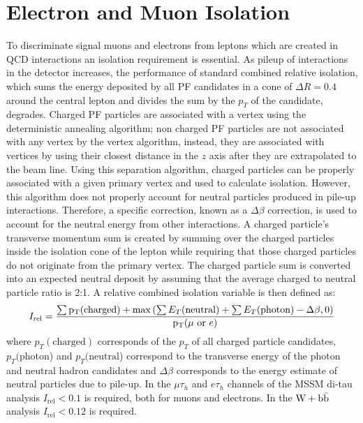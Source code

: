\section{Electron and Muon Isolation}
\label{sec:Isolation}
To discriminate signal muons and electrons from leptons
which are created in QCD interactions an isolation requirement is essential. 
As pileup of interactions in the detector increases, the performance of standard
combined relative isolation, which sums the 
energy deposited by all PF candidates in a cone of $\Delta R = 0.4$ around the central
lepton and divides the sum by the $p_{T}$ of 
the candidate, degrades. Charged PF particles are associated with 
a vertex using the deterministic annealing algorithm; non charged PF particles
are not associated with any vertex by the vertex algorithm, instead,
they are associated with vertices by using their closest distance in the
$z$ axis after they are extrapolated to the beam line. Using this separation algorithm,
charged particles can be properly associated with a given primary vertex
and used to calculate isolation. However, this algorithm does not
properly account for neutral particles produced in pile-up interactions. 
Therefore, a specific correction, known as a $\Delta \beta$ correction, is
used to account for the neutral energy from other interactions.
A charged particle's transverse momentum sum is created by summing over
the charged particles inside the isolation cone of the lepton while %
requiring that those charged particles do not originate from the primary vertex.
The charged particle sum is converted into an expected neutral deposit by
assuming that the average charged to neutral particle ratio is 2:1.
A relative combined isolation variable is then defined as:
\begin{equation}
I_{\rm rel} = \frac{\sum{\mathrm{p_{T}}(\mathrm{charged})} + \max\left(\sum{E_{T}(\mathrm{neutral})} + \sum{E_{T}(\mathrm{photon})} - \Delta\beta, 0\right)}{\mathrm{p_{T}}(\mu \, \, \mathrm{or} \,\, e)}
\label{eq:relIso}
\end{equation}
where $p_{T}(\mathrm{charged})$ corresponds of the $p_{T}$ 
of all charged particle candidates, $p_{T}(\mathrm{photon}$)
and $p_{T}(\mathrm{neutral}$) correspond to the transverse 
energy of the photon and neutral hadron candidates
and $\Delta\beta$ corresponds to the energy estimate of neutral particles due to pile-up.
In the $\mu\tau_{h}$ and $e\tau_{h}$ channels of the MSSM di-tau 
analysis $I_{\mathrm{rel}}<0.1$ is required, both for muons and electrons. In the $\mathrm{W+\mathrm{b\bar{b}}}$
analysis $I_{\mathrm{rel}}<0.12$ is required. 

